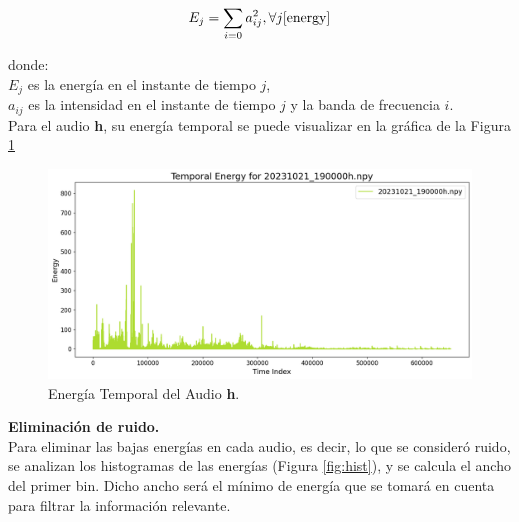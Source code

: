 \documentclass[a4paper,10pt,twocolumn]{article}
\begin{document}
\begin{equation*}
	E_j = \sum_{i=0} a_{ij}^{2}, \forall j     \cite{energy}
\end{equation*} 


donde:\\
$E_j$ es la energía en el instante de tiempo $j$,\\
$a_{ij}$ es la intensidad en el instante de tiempo $j$ y la banda de frecuencia $i$.\\

Para el audio \textbf{h}, su energía temporal se puede visualizar en la gráfica de la Figura \ref{fig:energy}\\

\begin{figure}[h!]
    \centering
    \includegraphics[width=\columnwidth]{assets/temp_energy.png}
    \caption{Energía Temporal del Audio \textbf{h}.}
    \label{fig:energy}
\end{figure}


\textbf{Eliminación de ruido.}\\

Para eliminar las bajas energías en cada audio, es decir, lo que se consideró ruido, se analizan los histogramas de las energías (Figura \ref{fig:hist}),
y se calcula el ancho del primer bin. Dicho ancho será el mínimo de energía que se tomará en cuenta para filtrar la información relevante.\\
\end{document}
